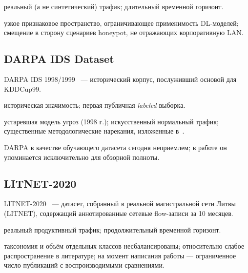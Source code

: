\begin{description}[font=\normalfont\itshape, leftmargin=1.5em]
    \item[Сильные стороны:] реальный (а не синтетический) трафик; длительный
    временной горизонт.
    \item[Ограничения:] узкое признаковое пространство, ограничивающее
    применимость DL-моделей; смещение в сторону сценариев honeypot, не
    отражающих корпоративную LAN.
\end{description}

\subsection{DARPA IDS Dataset}

DARPA IDS 1998/1999~\cite{lippmann2000darpa} --- исторический корпус,
послуживший основой для KDDCup99.

\begin{description}[font=\normalfont\itshape, leftmargin=1.5em]
    \item[Сильные стороны:] историческая значимость; первая публичная
    \emph{labeled}-выборка.
    \item[Ограничения:] устаревшая модель угроз (1998 г.); искусственный
    нормальный трафик; существенные методологические нарекания, изложенные
    в~\cite{sommer2010outside, moustafa2016eval}.
\end{description}

DARPA в качестве обучающего датасета сегодня неприемлем; в работе он
упоминается исключительно для обзорной полноты.

\subsection{LITNET-2020}

LITNET-2020~\cite{damasevicius2020litnet} --- датасет, собранный в реальной
магистральной сети Литвы (LITNET), содержащий аннотированные сетевые
flow-записи за 10 месяцев.

\begin{description}[font=\normalfont\itshape, leftmargin=1.5em]
    \item[Сильные стороны:] реальный продуктивный трафик; продолжительный
    временной горизонт.
    \item[Ограничения:] таксономия и объём отдельных классов несбалансированы;
    относительно слабое распространение в литературе; на момент написания
    работы --- ограниченное число публикаций с воспроизводимыми сравнениями.
\end{description}

